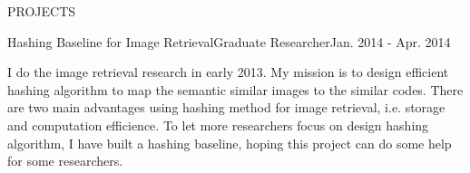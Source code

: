 \documentclass{resume} %
\begin{document}
\begin{rSection}{PROJECTS}

\begin{pSubsection}{Hashing Baseline for Image Retrieval}{Graduate Researcher}{Jan. 2014 - Apr. 2014}
\item I do the image retrieval research in early 2013. My mission is to design efficient hashing algorithm to map the semantic similar images to the similar codes. There are two main advantages using hashing method for image retrieval, i.e. storage and computation efficience. To let more researchers focus on design hashing algorithm, I have built a hashing baseline, hoping this project can do some help for some researchers.
\end{pSubsection}
\end{rSection}


\end{document}
